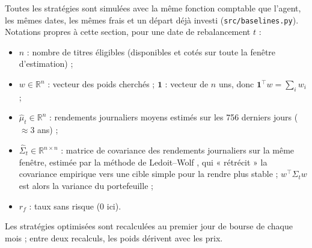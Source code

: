 \documentclass[11pt,a4paper]{article}
\newcommand{\R}{\mathbb{R}}
\begin{document}
Toutes les stratégies sont simulées avec la même fonction comptable que l'agent, les mêmes dates, les mêmes frais
et un départ déjà investi (\texttt{src/baselines.py}). Notations propres à cette section, pour une date de
rebalancement \(t\) :
\begin{itemize}
  \item \(n\) : nombre de titres éligibles (disponibles et cotés sur toute la fenêtre d'estimation) ;
  \item \(w\in\R^n\) : vecteur des poids cherchés ; \(\mathbf 1\) : vecteur de \(n\) uns, donc
        \(\mathbf 1^\top w=\sum_i w_i\) ;
  \item \(\hat\mu_t\in\R^n\) : rendements journaliers moyens estimés sur les 756 derniers jours (\(\approx3\) ans) ;
  \item \(\hat\Sigma_t\in\R^{n\times n}\) : matrice de covariance des rendements journaliers sur la même fenêtre,
        estimée par la méthode de Ledoit--Wolf \cite{ledoitwolf2004}, qui « rétrécit » la covariance empirique vers
        une cible simple pour la rendre plus stable ; \(w^\top\hat\Sigma_t w\) est alors la variance du portefeuille ;
  \item \(r_f\) : taux sans risque (0 ici).
\end{itemize}
Les stratégies optimisées sont recalculées au premier jour de bourse de chaque mois ; entre deux recalculs, les
poids dérivent avec les prix.
\end{document}
